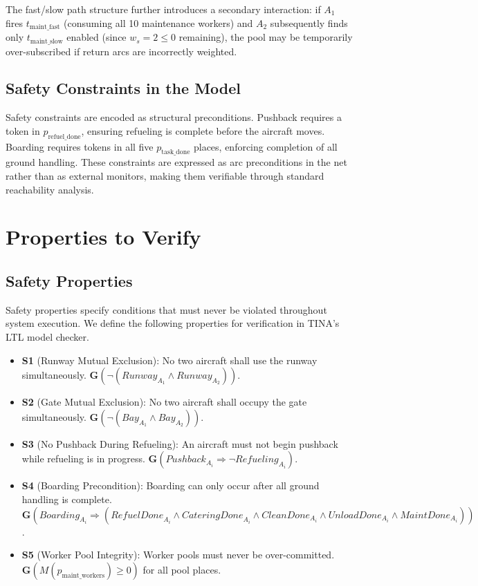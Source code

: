 \documentclass[conference,a4paper]{IEEEtran}
\begin{document}
The fast/slow path structure further introduces a secondary interaction: if
$A_1$ fires $t_{\mathrm{maint\_fast}}$ (consuming all 10 maintenance
workers) and $A_2$ subsequently finds only $t_{\mathrm{maint\_slow}}$
enabled (since $w_s = 2 \le 0$ remaining), the pool may be temporarily
over-subscribed if return arcs are incorrectly weighted.

\subsection{Safety Constraints in the Model}

Safety constraints are encoded as structural preconditions. Pushback requires
a token in $p_{\mathrm{refuel\_done}}$, ensuring refueling is complete
before the aircraft moves. Boarding requires tokens in all five
$p_{\mathrm{task\_done}}$ places, enforcing completion of all ground
handling. These constraints are expressed as arc preconditions in the net
rather than as external monitors, making them verifiable through standard
reachability analysis.

\section{Properties to Verify}

\subsection{Safety Properties}

Safety properties specify conditions that must never be violated throughout
system execution. We define the following properties for verification in
TINA's LTL model checker.

\begin{itemize}
  \item \textbf{S1} (Runway Mutual Exclusion): No two aircraft shall use the
    runway simultaneously.
    $\mathbf{G}(\neg(\mathit{Runway}_{A_1} \wedge \mathit{Runway}_{A_2}))$.
  \item \textbf{S2} (Gate Mutual Exclusion): No two aircraft shall occupy the
    gate simultaneously.
    $\mathbf{G}(\neg(\mathit{Bay}_{A_1} \wedge \mathit{Bay}_{A_2}))$.
  \item \textbf{S3} (No Pushback During Refueling): An aircraft must not begin
    pushback while refueling is in progress.
    $\mathbf{G}(\mathit{Pushback}_{A_i} \Rightarrow \neg\mathit{Refueling}_{A_i})$.
  \item \textbf{S4} (Boarding Precondition): Boarding can only occur after all
    ground handling is complete.
    $\mathbf{G}(\mathit{Boarding}_{A_i} \Rightarrow (\mathit{RefuelDone}_{A_i}
     \wedge \mathit{CateringDone}_{A_i} \wedge \mathit{CleanDone}_{A_i}
     \wedge \mathit{UnloadDone}_{A_i} \wedge \mathit{MaintDone}_{A_i}))$.
  \item \textbf{S5} (Worker Pool Integrity): Worker pools must never be
    over-committed.
    $\mathbf{G}(M(p_{\mathrm{maint\_workers}}) \ge 0)$ for all pool places.
\end{itemize}
\end{document}
